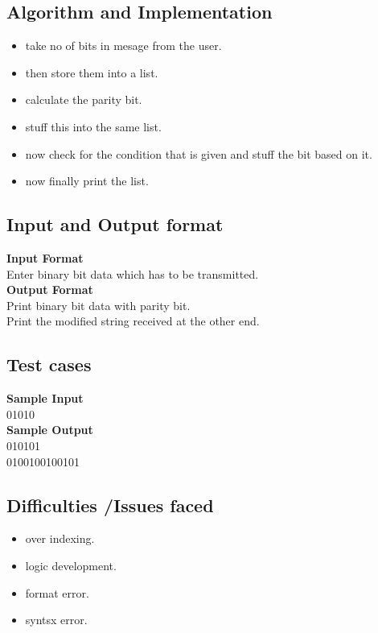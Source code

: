 \documentclass[12]{article}
\begin{document}
\subsection{Algorithm and Implementation}
\begin{itemize}
\item take no of bits in mesage from the user.
\item then store them into a list.
\item calculate the parity bit.
\item stuff this into the same list.
\item now check for the condition that is given and stuff the bit based on it.
\item now finally print the list.
\end{itemize}
\subsection{Input and Output format}
\textbf{Input Format} \\
Enter binary bit data which has to be transmitted. \\


\textbf{Output Format} \\
Print binary bit data with parity bit.\\
Print the modified string received at the other end. \\


\subsection{Test cases}
\textbf{Sample Input}\\
01010 \\

\textbf{Sample Output} \\
010101 \\ 
0100100100101 \\

\subsection{Difficulties /Issues faced}
\begin{itemize}
\item over indexing.
\item logic development.
\item format error.
\item syntsx error.
\end{itemize}
\end{document}
